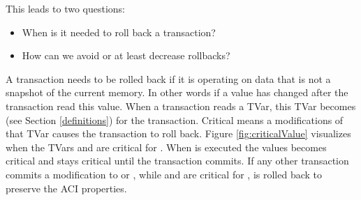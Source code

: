 This leads to two questions:
\begin{itemize}
 \item When is it needed to roll back a transaction?
 \item How can we avoid or at least decrease rollbacks?
\end{itemize}
A transaction needs to be rolled back if it is operating on data that is not a snapshot of the current memory. In other words 
if a value has changed after the transaction read this value. When a transaction reads a TVar, this TVar becomes 
(see Section \ref{definitions}) for the transaction. Critical means a modifications of that TVar causes the transaction to roll back.
Figure \ref{fig:criticalValue} visualizes when the TVars  and  are critical for .
When  is executed the values becomes critical and stays critical until the transaction commits.
If any other transaction commits a modification to  or , while  and  are
critical for ,  is rolled back to preserve the ACI properties. 

